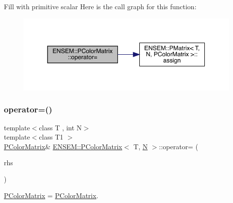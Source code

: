 Fill with primitive scalar Here is the call graph for this function\+:
\nopagebreak
\begin{figure}[H]
\begin{center}
\leavevmode
\includegraphics[width=338pt]{d8/d21/classENSEM_1_1PColorMatrix_a7750e72b224e47b6a559f3dc112b72d3_cgraph}
\end{center}
\end{figure}
\mbox{\label{classENSEM_1_1PColorMatrix_a529b6a2c63f2087a6a336af14b6f80eb}} 
\subsubsection{\texorpdfstring{operator=()}{operator=()}\hspace{0.1cm}{\footnotesize\ttfamily [3/4]}}
{\footnotesize\ttfamily template$<$class T , int N$>$ \\
template$<$class T1 $>$ \\
\mbox{\hyperlink{classENSEM_1_1PColorMatrix}{P\+Color\+Matrix}}\& \mbox{\hyperlink{classENSEM_1_1PColorMatrix}{E\+N\+S\+E\+M\+::\+P\+Color\+Matrix}}$<$ T, \mbox{\hyperlink{operator__name__util_8cc_a7722c8ecbb62d99aee7ce68b1752f337}{N}} $>$\+::operator= (\begin{DoxyParamCaption}\item[{const \mbox{\hyperlink{classENSEM_1_1PColorMatrix}{P\+Color\+Matrix}}$<$ T1, \mbox{\hyperlink{operator__name__util_8cc_a7722c8ecbb62d99aee7ce68b1752f337}{N}} $>$ \&}]{rhs }\end{DoxyParamCaption})\hspace{0.3cm}{\ttfamily [inline]}}



\mbox{\hyperlink{classENSEM_1_1PColorMatrix}{P\+Color\+Matrix}} = \mbox{\hyperlink{classENSEM_1_1PColorMatrix}{P\+Color\+Matrix}}. 

